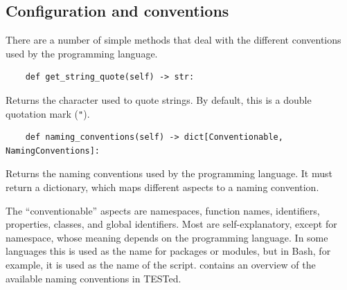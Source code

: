 \documentclass[../main]{subfiles}
\begin{document}
\subsection{Configuration and conventions}\label{subsec:configuration-and-conventions}

There are a number of simple methods that deal with the different conventions used by the programming language.

\begin{verbatim}
    def get_string_quote(self) -> str:
\end{verbatim}

Returns the character used to quote strings.
By default, this is a double quotation mark (\texttt{"}).

\begin{verbatim}
    def naming_conventions(self) -> dict[Conventionable, NamingConventions]:
\end{verbatim}

Returns the naming conventions used by the programming language.
It must return a dictionary, which maps different aspects to a naming convention.

The ``conventionable'' aspects are namespaces, function names, identifiers, properties, classes, and global identifiers.
Most are self-explanatory, except for namespace, whose meaning depends on the programming language.
In some languages this is used as the name for packages or modules, but in Bash, for example, it is used as the name of the script.
 contains an overview of the available naming conventions in TESTed.
\end{document}
